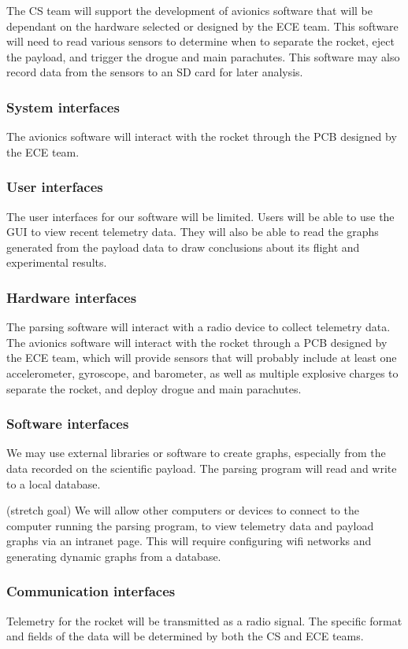 \documentclass[onecolumn, draftclsnofoot, 10pt, compsoc]{IEEEtran}
\begin{document}
The CS team will support the development of avionics software that will be dependant on the hardware selected or designed by the ECE team. This software will need to read various sensors to determine when to separate the rocket, eject the payload, and trigger the drogue and main parachutes.  This software may also record data from the sensors to an SD card for later analysis.

\subsubsection{System interfaces}
The avionics software will interact with the rocket through the PCB designed by the ECE team.

\subsubsection{User interfaces}
The user interfaces for our software will be limited. Users will be able to use the GUI to view recent telemetry data. They will also be able to read the graphs generated from the payload data to draw conclusions about its flight and experimental results.

\subsubsection{Hardware interfaces}
The parsing software will interact with a radio device to collect telemetry data.  The avionics software will interact with the rocket through a PCB designed by the ECE team, which will provide sensors that will probably include at least one accelerometer, gyroscope, and barometer, as well as multiple explosive charges to separate the rocket, and deploy drogue and main parachutes.

\subsubsection{Software interfaces}
We may use external libraries or software to create graphs, especially from the data recorded on the scientific payload.  The parsing program will read and write to a local database.

(stretch goal) We will allow other computers or devices to connect to the computer running the parsing program, to view telemetry data and payload graphs via an intranet page.  This will require configuring wifi networks and generating dynamic graphs from a database.

\subsubsection{Communication interfaces}
Telemetry for the rocket will be transmitted as a radio signal.  The specific format and fields of the data will be determined by both the CS and ECE teams.
\end{document}

